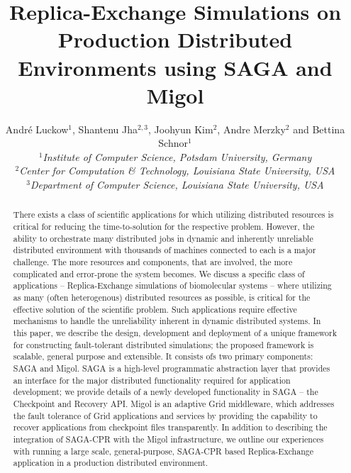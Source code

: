 \documentclass[times, 10pt, twocolumn]{article}
\title{Replica-Exchange Simulations on Production Distributed
  Environments using SAGA and Migol}
\author{
  Andr\'e Luckow$^{1}$, Shantenu Jha$^{2,3}$, Joohyun Kim$^{2}$, Andre Merzky$^{2}$ and Bettina Schnor$^{1}$\\
  \small{\emph{$^{1}$Institute of Computer Science, Potsdam University, Germany}}\\
  \small{\emph{$^{2}$Center for Computation \& Technology, Louisiana State University, USA}}\\
  \small{\emph{$^{3}$Department of Computer Science, Louisiana State University, USA}}\\
}
\begin{document}
 


\maketitle    

\begin{abstract}
  There exists a class of scientific applications for which utilizing
  distributed resources is critical for reducing the time-to-solution for
  the respective problem. However, the ability to orchestrate 
  many distributed jobs in dynamic and inherently unreliable distributed environment
  with thousands of machines connected to
  each is a major challenge. The more resources and components,
  that are involved, %
  the more complicated  and error-prone the system becomes. We discuss a specific class of
  applications -- Replica-Exchange simulations of biomolecular systems
  -- where utilizing as many (often heterogenous) distributed
  resources as possible, is critical for the effective solution of the
  scientific problem. Such applications require effective mechanisms to handle the
  unreliability inherent in dynamic distributed systems. 
  In this paper, we describe the design, development and
  deployment of a unique framework for constructing fault-tolerant
  distributed simulations; %
  the proposed framework is scalable,
  general purpose and extensible. It consists ofs two primary
  components: SAGA and Migol.  SAGA is a high-level programmatic
  abstraction layer that provides an interface for the major
  distributed functionality required for application development; we
  provide details of a newly developed functionality in SAGA -- the
  Checkpoint and Recovery API. Migol is an adaptive Grid middleware,
  which addresses the fault tolerance of Grid applications and
  services by providing the capability to recover applications from
  checkpoint files transparently.  In addition to describing 
  the integration of SAGA-CPR with the Migol infrastructure, 
  we outline our experiences with
  running a large scale, general-purpose, SAGA-CPR based
  Replica-Exchange application in a production distributed
  environment.

    

\end{abstract}
\end{document}
